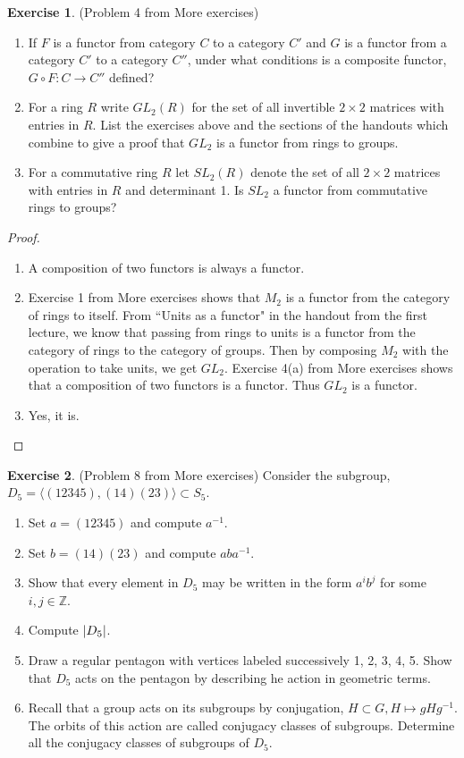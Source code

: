 \documentclass[12pt, psamsfonts]{amsart}
\theoremstyle{definition}
\newtheorem*{exer}{Exercise}
\theoremstyle{remark}
\numberwithin{equation}{section}
\begin{document}
\begin{exer}{(Problem 4 from More exercises)}
  \begin{enumerate}
    \item
      If $F$ is a functor from category $C$ to a category $C'$ and $G$ is a functor from a category $C'$ to a category $C''$, under what conditions is a composite functor, $G \circ F: C \rightarrow C''$ defined?
    \item
      For a ring $R$ write $GL_2(R)$ for the set of all invertible $2 \times 2$ matrices with entries in $R$.
      List the exercises above and the sections of the handouts which combine to give a proof that $GL_2$ is a functor from rings to groups.
    \item
      For a commutative ring $R$ let $SL_2(R)$ denote the set of all $2 \times 2$ matrices with entries in $R$ and determinant 1.
      Is $SL_2$ a functor from commutative rings to groups?
  \end{enumerate}
\end{exer}

\begin{proof}
$ $
  \begin{enumerate}
    \item
      A composition of two functors is always a functor.
    \item
      Exercise 1 from More exercises shows that $M_2$ is a functor from the category of rings to itself.
      From ``Units as a functor" in the handout from the first lecture, we know that passing from rings to units is a functor from the category of rings to the category of groups.
      Then by composing $M_2$ with the operation to take units, we get $GL_2$.
      Exercise 4(a) from More exercises shows that a composition of two functors is a functor.
      Thus $GL_2$ is a functor.
    \item
      Yes, it is.
  \end{enumerate}
\end{proof}

\begin{exer}{(Problem 8 from More exercises)}
  Consider the subgroup, $D_5 = \langle (12345), (14)(23) \rangle \subset S_5$.
  \begin{enumerate}
    \item
      Set $a = (12345)$ and compute $a^{-1}$.
    \item
      Set $b = (14)(23)$ and compute $aba^{-1}$.
    \item
      Show that every element in $D_5$ may be written in the form $a^ib^j$ for some $i, j \in \mathbb{Z}$.
    \item
      Compute $\abs{D_5}$.
    \item
      Draw a regular pentagon with vertices labeled successively 1, 2, 3, 4, 5.
      Show that $D_5$ acts on the pentagon by describing he action in geometric terms.
    \item
      Recall that a group acts on its subgroups by conjugation, $H \subset G, H \mapsto gHg^{-1}$.
      The orbits of this action are called conjugacy classes of subgroups.
      Determine all the conjugacy classes of subgroups of $D_5$.
  \end{enumerate}
\end{exer}
\end{document}
